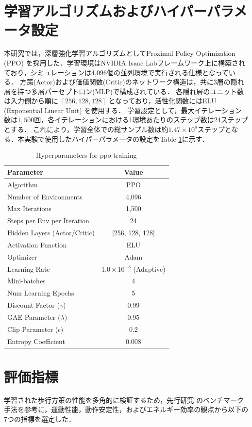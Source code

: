 \section{学習アルゴリズムおよびハイパーパラメータ設定}
本研究では，深層強化学習アルゴリズムとしてProximal Policy Optimization (PPO) \cite{schulman2017proximal} を採用した．学習環境はNVIDIA Isaac Lab\cite{mittal2025isaaclab}フレームワーク上に構築されており，シミュレーションは4,096個の並列環境で実行される仕様となっている．
方策(Actor)および価値関数(Critic)のネットワーク構造は，共に3層の隠れ層を持つ多層パーセプトロン(MLP)で構成されている．
各隠れ層のユニット数は入力側から順に $[256, 128, 128]$ となっており，活性化関数にはELU (Exponential Linear Unit) を使用する．
学習設定として，最大イテレーション数は$1,500$回，各イテレーションにおける1環境あたりのステップ数は24ステップとする．
これにより，学習全体での総サンプル数は約$1.47 \times 10^8$ステップとなる．本実験で使用したハイパーパラメータの設定をTable \ref{tab:hyperparameters}に示す．


\begin{table}[H]
    \centering
    \caption{Hyperparameters for ppo training}
    \label{tab:hyperparameters}
    \begin{tabular}{lc}
    \hline
    \textbf{Parameter} & \textbf{Value} \\
    \hline
    Algorithm & PPO \\
    Number of Environments & 4,096 \\
    Max Iterations & 1,500 \\
    Steps per Env per Iteration & 24 \\
    Hidden Layers (Actor/Critic) & [256, 128, 128] \\
    Activation Function & ELU \\
    Optimizer & Adam \\
    Learning Rate & $1.0 \times 10^{-3}$ (Adaptive) \\
    Mini-batches & 4 \\
    Num Learning Epochs & 5 \\
    Discount Factor ($\gamma$) & 0.99 \\
    GAE Parameter ($\lambda$) & 0.95 \\
    Clip Parameter ($\epsilon$) & 0.2 \\
    Entropy Coefficient & 0.008 \\
    \hline
    \end{tabular}
\end{table}

\section{評価指標}
学習された歩行方策の性能を多角的に検証するため，先行研究\cite{van2024revisiting}\cite{peng2025gait}\cite{yoshida2025improving}
のベンチマーク手法を参考に，運動性能，動作安定性，およびエネルギー効率の観点から以下の7つの指標を選定した．

